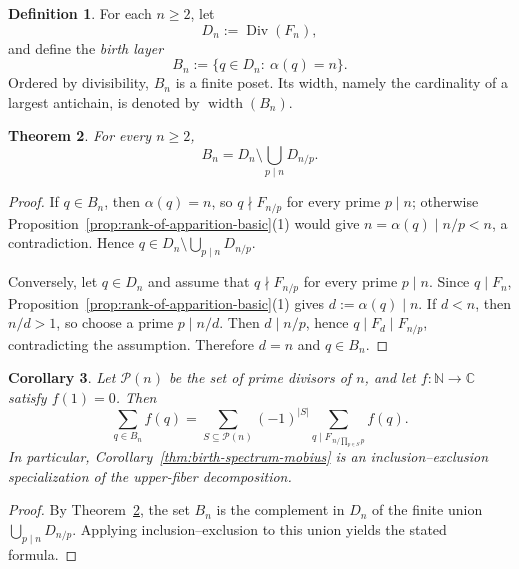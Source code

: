 \documentclass[11pt,letterpaper]{article}
\numberwithin{equation}{section}
\theoremstyle{plain}
\newtheorem{theorem}{Theorem}[section]
\newtheorem{corollary}[theorem]{Corollary}
\theoremstyle{definition}
\newtheorem{definition}[theorem]{Definition}
\theoremstyle{remark}
\newcommand{\NN}{\mathbb{N}}
\DeclareMathOperator{\widthop}{width}
\begin{document}
\begin{definition}
\label{def:birth-layer-poset}
For each $n\ge 2$, let
\[
D_n:=\operatorname{Div}(F_n),
\]
and define the \emph{birth layer}
\[
B_n:=\{q\in D_n:\ \alpha(q)=n\}.
\]
Ordered by divisibility, $B_n$ is a finite poset. Its width, namely the
cardinality of a largest antichain, is denoted by $\widthop(B_n)$.
\end{definition}

\begin{theorem}
\label{thm:upper-fiber-cover-ideal}
For every $n\ge 2$,
\[
B_n=D_n\setminus\bigcup_{p\mid n} D_{n/p}.
\]
\end{theorem}

\begin{proof}
If $q\in B_n$, then $\alpha(q)=n$, so $q\nmid F_{n/p}$ for every prime
$p\mid n$; otherwise Proposition~\ref{prop:rank-of-apparition-basic}(1) would
give $n=\alpha(q)\mid n/p<n$, a contradiction. Hence
$q\in D_n\setminus\bigcup_{p\mid n} D_{n/p}$.

Conversely, let $q\in D_n$ and assume that $q\nmid F_{n/p}$ for every prime
$p\mid n$. Since $q\mid F_n$, Proposition~\ref{prop:rank-of-apparition-basic}(1)
gives $d:=\alpha(q)\mid n$. If $d<n$, then $n/d>1$, so choose a prime
$p\mid n/d$. Then $d\mid n/p$, hence $q\mid F_d\mid F_{n/p}$, contradicting
the assumption. Therefore $d=n$ and $q\in B_n$.
\end{proof}

\begin{corollary}
\label{cor:upper-fiber-inclusion-exclusion}
Let $\mathcal P(n)$ be the set of prime divisors of $n$, and let
$f:\NN\to\mathbb{C}$ satisfy $f(1)=0$. Then
\[
\sum_{q\in B_n} f(q)
=
\sum_{S\subseteq \mathcal P(n)}
(-1)^{|S|}
\sum_{q\mid F_{\,n/\prod_{p\in S}p}} f(q).
\]
In particular, Corollary~\ref{thm:birth-spectrum-mobius} is an
inclusion--exclusion specialization of the upper-fiber decomposition.
\end{corollary}

\begin{proof}
By Theorem~\ref{thm:upper-fiber-cover-ideal}, the set $B_n$ is the complement
in $D_n$ of the finite union $\bigcup_{p\mid n} D_{n/p}$. Applying
inclusion--exclusion to this union yields the stated formula.
\end{proof}
\end{document}
